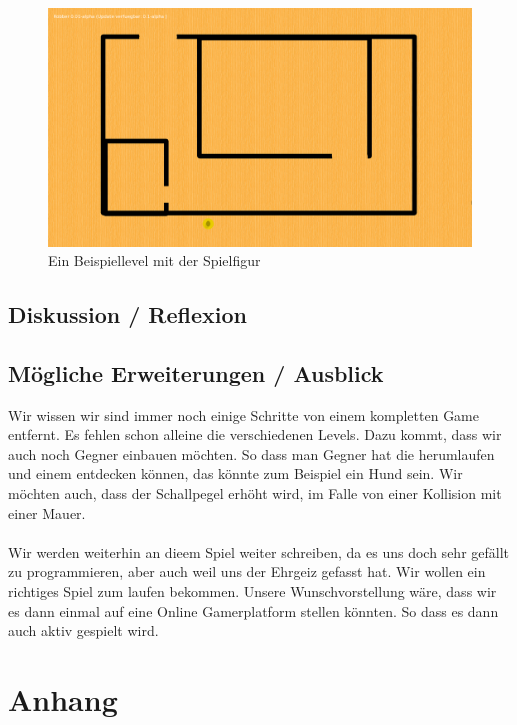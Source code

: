 \documentclass[11pt,a4paper]{scrbook}
\begin{document}
\begin{figure}[h]
\centering
\includegraphics[scale=0.25]{img/grafiken.png}
\caption{Ein Beispiellevel mit der Spielfigur}
\end{figure}


\chapter{Diskussion / Reflexion}


\chapter{Mögliche Erweiterungen / Ausblick}
Wir wissen wir sind immer noch einige Schritte von einem kompletten Game entfernt. Es fehlen schon alleine die verschiedenen Levels. Dazu kommt, dass wir auch noch Gegner einbauen möchten. So dass man Gegner hat die herumlaufen und einem entdecken können, das könnte zum Beispiel ein Hund sein. Wir möchten auch, dass der Schallpegel erhöht wird, im Falle von einer Kollision mit einer Mauer. 	
\\ 	
\\ 	
Wir werden weiterhin an dieem Spiel weiter schreiben, da es uns doch sehr gefällt zu programmieren, aber auch weil uns der Ehrgeiz gefasst hat. Wir wollen ein richtiges Spiel zum laufen bekommen. Unsere Wunschvorstellung wäre, dass wir es dann einmal auf eine Online Gamerplatform stellen könnten. So dass es dann auch aktiv gespielt wird. 


\clearpage
\part{Anhang}
\listoffigures

\clearpage

\printbibliography
\end{document}
